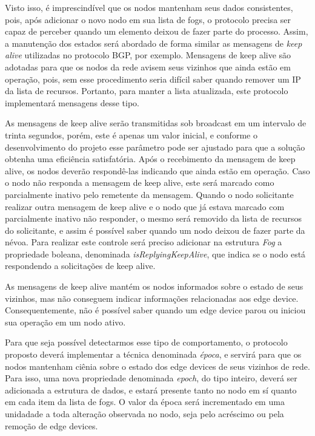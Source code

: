 Visto isso, é imprescindível que os nodos mantenham seus dados consistentes, pois, após adicionar o novo nodo em sua lista de fogs, o protocolo precisa ser capaz de perceber quando um elemento
deixou de fazer parte do processo. Assim, a manutenção dos estados será abordado de forma similar as mensagens de \textit{keep alive} utilizadas no protocolo BGP, por exemplo.
Mensagens de keep alive são adotadas para que os nodos da rede avisem seus vizinhos que ainda estão em operação, pois, sem esse procedimento seria difícil
saber quando remover um IP da lista de recursos. Portanto, para manter a lista atualizada, este protocolo implementará mensagens desse tipo.

As mensagens de keep alive serão transmitidas sob broadcast em um intervalo de trinta segundos, porém, este é apenas um valor inicial, e conforme o desenvolvimento do projeto esse
parâmetro pode ser ajustado para que a solução obtenha uma eficiência satisfatória.
Após o recebimento da mensagem de keep alive, os nodos deverão respondê-las indicando que ainda estão em operação.
Caso o nodo não responda a mensagem de keep alive, este será marcado como parcialmente inativo pelo remetente da mensagem.
Quando o nodo solicitante realizar outra mensagem de keep alive e o nodo que já estava marcado com parcialmente inativo não responder, o mesmo será removido da lista de recursos do
solicitante, e assim é possível saber quando um nodo deixou de fazer parte da névoa.
Para realizar este controle será preciso adicionar na estrutura \textit{Fog} a propriedade boleana, denominada \textit{isReplyingKeepAlive}, que indica se o nodo está respondendo a solicitações de keep alive.

As mensagens de keep alive mantém os nodos informados sobre o estado de seus vizinhos, mas não conseguem indicar informações relacionadas aos edge device.
Consequentemente, não é possível saber quando um edge device parou ou iniciou sua operação em um nodo ativo.

Para que seja possível detectarmos esse tipo de comportamento, o protocolo proposto deverá implementar a técnica denominada \textit{época},
e servirá para que os nodos mantenham ciênia sobre o estado dos edge devices de seus vizinhos de rede.
Para isso, uma nova propriedade denominada \textit{epoch}, do tipo inteiro, deverá ser adicionada a estrutura de dados, e estará presente tanto no nodo em sí quanto em cada item da lista de fogs.
O valor da época será incrementado em uma unidadade a toda alteração observada no nodo, seja pelo acréscimo ou pela remoção de edge devices.

